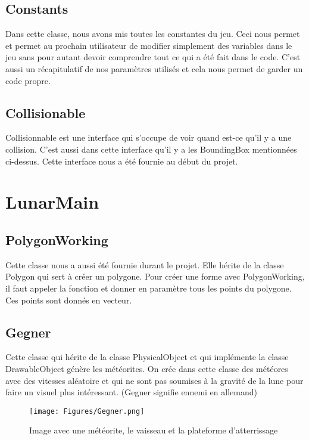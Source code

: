 \subsection{Constants}
Dans cette classe, nous avons mis toutes les constantes du jeu. Ceci nous permet et permet au prochain utilisateur de modifier simplement des variables dans le jeu sans pour autant devoir comprendre tout ce qui a été fait dans le code. C’est aussi un récapitulatif de nos paramètres utilisés et cela nous permet de garder un code propre.

\subsection{Collisionable}
Collisionnable est une interface qui s’occupe de voir quand est-ce qu’il y a une collision. C’est aussi dans cette interface qu’il y a les BoundingBox mentionnées ci-dessus. Cette interface nous a été fournie au début du projet.

\section{LunarMain}

\subsection{PolygonWorking}
Cette classe nous a aussi été fournie durant le projet. Elle hérite de la classe Polygon qui sert à créer un polygone. Pour créer une forme avec PolygonWorking, il faut appeler la fonction et donner en paramètre tous les points du polygone. Ces points sont donnés en vecteur.

\subsection{Gegner}
Cette classe qui hérite de la classe PhysicalObject et qui implémente la classe DrawableObject génère les météorites. On crée dans cette classe des météores avec des vitesses aléatoire et qui ne sont pas soumises à la gravité de la lune pour faire un visuel plus intéressant. (Gegner signifie ennemi en allemand)

\begin{figure}[h]
 \centering
 \texttt{[image: Figures/Gegner.png]}
 \caption{Image avec une météorite, le vaisseau et la plateforme d'atterrissage}
 \label{figure:Ground}
\end{figure}

